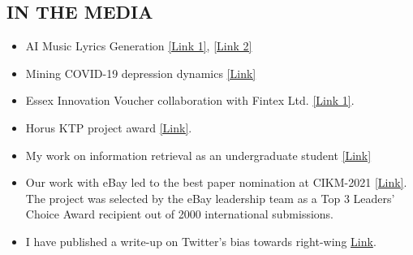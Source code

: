 \documentclass[margin]{res}
\begin{document}
\begin{resume}
\section{IN THE MEDIA}
\begin{itemize}
    \item AI Music Lyrics Generation \href{https://www.thesun.co.uk/tech/23184161/ai-creates-first-love-song/}{[Link 1]}, \href{https://www.southampton.ac.uk/news/2023/07/love-letters-with-ai.page}{[Link 2]}
    \item Mining COVID-19 depression dynamics \href{https://www.gazette-news.co.uk/news/19068066.twitter-research-university-essex-shows-increase-depression-pandemic/}{[Link]}
    \item Essex Innovation Voucher collaboration with Fintex Ltd. \href{https://www.essex.ac.uk/news/2021/06/25/rolecatcher-helping-our-students}{[Link 1]}.
    \item Horus KTP project award \href{https://www.essex.ac.uk/news/2021/11/30/horus-security-consultancy-partners-with-university-of-essex}{[Link]}.
    \item My work on information retrieval as an undergraduate student \href{https://bashthebuilder.github.io/files/Shoaib.jpg}{[Link]}
    \item Our work with eBay led to the best paper nomination at CIKM-2021 \href{https://www.bandt.com.au/reaching-gen-z-a-new-tool-for-marketers/}{[Link]}. The project was selected by the eBay leadership team as a Top 3 Leaders' Choice Award recipient out of 2000 international submissions.
    \item I have published a write-up on Twitter's bias towards right-wing \href{https://theconversation.com/twitters-algorithm-favours-the-political-right-a-recent-study-finds-175154}{Link}.
\end{itemize}


\end{resume}
\end{document}
